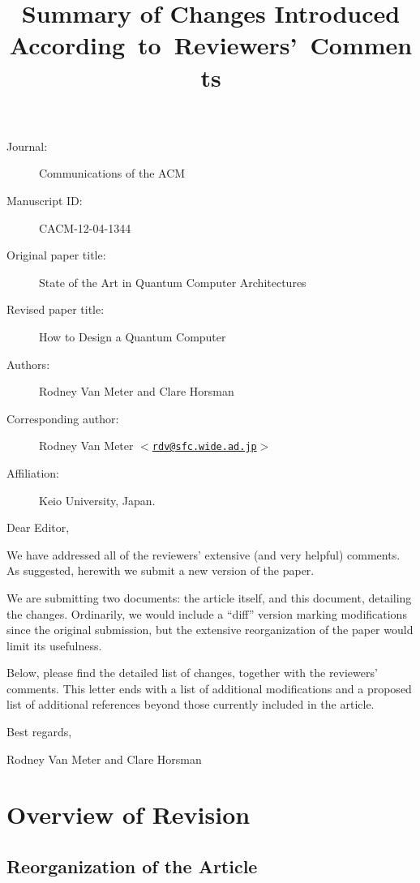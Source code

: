 \documentclass{article}
\title{Summary of Changes Introduced \mbox{According to Reviewers' Comments}}
\newcommand{\mailaddr}[1]{$<$\href{mailto:#1}{\texttt{#1}}$>$}
\begin{document}
\maketitle

\begin{description}
   \item[Journal:] Communications of the ACM
   \item[Manuscript ID:] CACM-12-04-1344
   \item[Original paper title:] State of the Art in Quantum Computer Architectures
   \item[Revised paper title:] How to Design a Quantum Computer
   \item[Authors:] Rodney Van Meter and Clare Horsman
   \item[Corresponding author:] Rodney Van Meter \mailaddr{rdv@sfc.wide.ad.jp}
   \item[Affiliation:] Keio University, Japan.
\end{description}


\bigskip\noindent Dear Editor,

\medskip 

We have addressed all of the reviewers' extensive (and very helpful)
comments. As suggested, herewith we submit a new version of the paper.

We are submitting two documents: the article itself, and this
document, detailing the changes.  Ordinarily, we would include a
``diff'' version marking modifications since the original submission,
but the extensive reorganization of the paper would limit its
usefulness.

Below, please find the detailed list of changes, together with the
reviewers' comments.  This letter ends with a list of additional
modifications and a proposed list of additional references beyond
those currently included in the article.

\medskip\noindent Best regards,

\begin{list}{}{\setlength{\itemsep}{0mm}}
\item Rodney Van Meter and Clare Horsman
\end{list}

\cleardoublepage

\section{Overview of Revision}

\subsection{Reorganization of the Article}
\label{sec:rearch}
\end{document}
